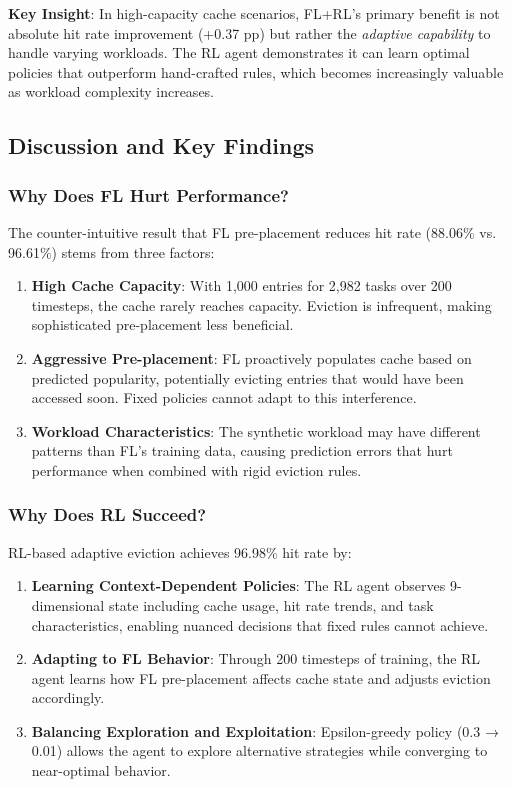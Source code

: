 \textbf{Key Insight}: In high-capacity cache scenarios, FL+RL's primary benefit is not absolute hit rate improvement (+0.37 pp) but rather the \textit{adaptive capability} to handle varying workloads. The RL agent demonstrates it can learn optimal policies that outperform hand-crafted rules, which becomes increasingly valuable as workload complexity increases.

\subsection{Discussion and Key Findings}

\subsubsection{Why Does FL Hurt Performance?}

The counter-intuitive result that FL pre-placement reduces hit rate (88.06\% vs. 96.61\%) stems from three factors:

\begin{enumerate}
    \item \textbf{High Cache Capacity}: With 1,000 entries for 2,982 tasks over 200 timesteps, the cache rarely reaches capacity. Eviction is infrequent, making sophisticated pre-placement less beneficial.
    
    \item \textbf{Aggressive Pre-placement}: FL proactively populates cache based on predicted popularity, potentially evicting entries that would have been accessed soon. Fixed policies cannot adapt to this interference.
    
    \item \textbf{Workload Characteristics}: The synthetic workload may have different patterns than FL's training data, causing prediction errors that hurt performance when combined with rigid eviction rules.
\end{enumerate}

\subsubsection{Why Does RL Succeed?}

RL-based adaptive eviction achieves 96.98\% hit rate by:

\begin{enumerate}
    \item \textbf{Learning Context-Dependent Policies}: The RL agent observes 9-dimensional state including cache usage, hit rate trends, and task characteristics, enabling nuanced decisions that fixed rules cannot achieve.
    
    \item \textbf{Adapting to FL Behavior}: Through 200 timesteps of training, the RL agent learns how FL pre-placement affects cache state and adjusts eviction accordingly.
    
    \item \textbf{Balancing Exploration and Exploitation}: Epsilon-greedy policy (0.3 → 0.01) allows the agent to explore alternative strategies while converging to near-optimal behavior.
\end{enumerate}

